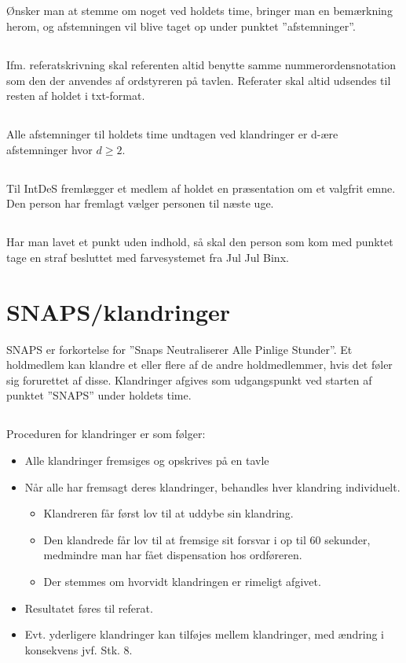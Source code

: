 \documentclass{article}
\begin{document}
	\subsection{}
	Ønsker man at stemme om noget ved holdets time, bringer man en bemærkning herom, og afstemningen vil blive taget op under punktet ”afstemninger”.
	\subsection{}
	Ifm. referatskrivning skal referenten altid benytte samme nummerordensnotation som den der anvendes af ordstyreren på tavlen. Referater skal altid udsendes til resten af holdet i txt-format.
	\subsection{}
	Alle afstemninger til holdets time undtagen ved klandringer er d-ære afstemninger hvor $d \geq 2$.
	\subsection{}
	Til IntDeS fremlægger et medlem af holdet en præsentation om et valgfrit emne. Den person har fremlagt vælger personen til næste uge.
	\subsection{}
	Har man lavet et punkt uden indhold, så skal den person som kom med punktet tage en straf besluttet med farvesystemet fra Jul Jul Binx.
	
	\section{SNAPS/klandringer}
	SNAPS er forkortelse for ”Snaps Neutraliserer Alle Pinlige Stunder”. Et holdmedlem kan klandre et eller flere af de andre holdmedlemmer, hvis det føler sig forurettet af disse. Klandringer afgives som udgangspunkt ved starten af punktet ”SNAPS” under holdets time.
	\subsection{}
	Proceduren for klandringer er som følger:
	\begin{itemize}
		\item Alle klandringer fremsiges og opskrives på en tavle
		\item Når alle har fremsagt deres klandringer, behandles hver klandring individuelt.
		\begin{itemize}
			\item Klandreren får først lov til at uddybe sin klandring.
			\item Den klandrede får lov til at fremsige sit forsvar i op til 60 sekunder, medmindre man har fået dispensation hos ordføreren.
			\item Der stemmes om hvorvidt klandringen er rimeligt afgivet.
		\end{itemize}
		\item Resultatet føres til referat.
		\item Evt. yderligere klandringer kan tilføjes mellem klandringer, med ændring i konsekvens jvf. Stk. 8.  
	\end{itemize}
\end{document}
